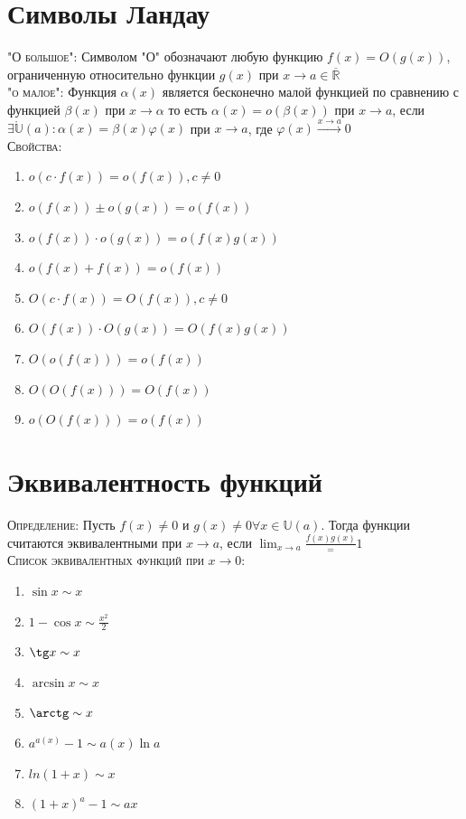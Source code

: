 \documentclass[14pt]{article}
\begin{document}
    \section{Символы Ландау}
        \textsc{"О большое":} Символом "О" обозначают любую функцию $f(x) = O(g(x))$, ограниченную относительно функции $g(x)$ при $x \rightarrow a \in \overline{\mathbb{R}}$ \\
        \textsc{"о малое":} Функция $\alpha(x)$ является бесконечно малой функцией по сравнению с функцией $\beta(x)$ при $x \rightarrow \alpha$ то есть $\alpha(x) = o(\beta(x))$ при $x \rightarrow a$, если 
        $\exists \mathring{\mathbb{U}}(a) : \alpha(x) = \beta(x)\varphi(x)$ при $x \rightarrow a$, где $\varphi(x) \xrightarrow{x \rightarrow a} 0$ \\
        \textsc{Свойства:} 
        \begin{enumerate}
            \item $o(c\cdot f(x)) = o(f(x)), c\ne0 $
            \item $o(f(x)) \pm o(g(x)) = o(f(x))$
            \item $o(f(x)) \cdot o(g(x)) = o(f(x)g(x))$
            \item $o(f(x) + f(x)) = o(f(x))$
            \item $O(c\cdot f(x)) = O(f(x)), c\ne0 $
            \item $O(f(x)) \cdot O(g(x)) = O(f(x)g(x))$
            \item $O(o(f(x))) = o(f(x))$
            \item $O(O(f(x))) = O(f(x))$
            \item $o(O(f(x))) = o(f(x))$
        \end{enumerate}

    \section{Эквивалентность функций}
        \textsc{Определение:} Пусть $f(x) \ne 0 $ и $g(x) \ne 0 \forall x \in \mathbb{U} (a) $. Тогда функции считаются эквивалентными при $x \rightarrow a$, если $\lim_{x \rightarrow a } \frac{f(x){g(x)}} =1$ \\ 
        \textsc{Список эквивалентных функций при $x \rightarrow 0$:} \\ 
        \begin{enumerate}
            \item $\sin x \sim x$
            \item $1 - \cos x \sim \frac{x^2}{2}$
            \item $\tg x \sim x$
            \item $\arcsin x \sim x$
            \item $\arctg \sim x$
            \item $a^{a(x)} -1 \sim a(x) \ln a$
            \item $ln(1+x) \sim x$
            \item $(1+x)^a - 1 \sim ax$
        \end{enumerate}
\end{document}
